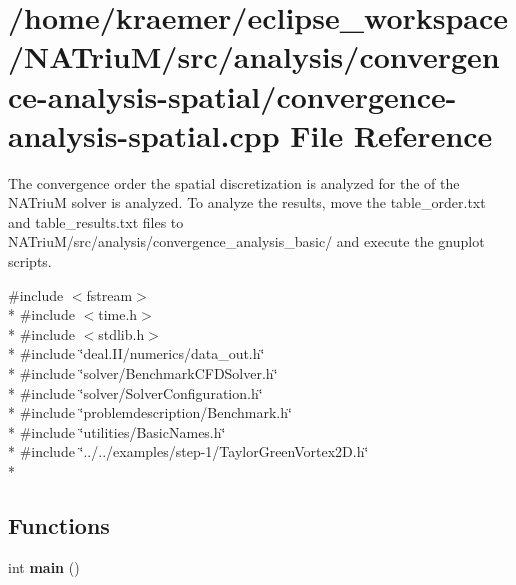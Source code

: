 \hypertarget{convergence-analysis-spatial_8cpp}{\section{/home/kraemer/eclipse\-\_\-workspace/\-N\-A\-Triu\-M/src/analysis/convergence-\/analysis-\/spatial/convergence-\/analysis-\/spatial.cpp File Reference}
\label{convergence-analysis-spatial_8cpp}
}


The convergence order the spatial discretization is analyzed for the of the N\-A\-Triu\-M solver is analyzed. To analyze the results, move the table\-\_\-order.\-txt and table\-\_\-results.\-txt files to N\-A\-Triu\-M/src/analysis/convergence\-\_\-analysis\-\_\-basic/ and execute the gnuplot scripts.  


{\ttfamily \#include $<$fstream$>$}\\*
{\ttfamily \#include $<$time.\-h$>$}\\*
{\ttfamily \#include $<$stdlib.\-h$>$}\\*
{\ttfamily \#include \char`\"{}deal.\-I\-I/numerics/data\-\_\-out.\-h\char`\"{}}\\*
{\ttfamily \#include \char`\"{}solver/\-Benchmark\-C\-F\-D\-Solver.\-h\char`\"{}}\\*
{\ttfamily \#include \char`\"{}solver/\-Solver\-Configuration.\-h\char`\"{}}\\*
{\ttfamily \#include \char`\"{}problemdescription/\-Benchmark.\-h\char`\"{}}\\*
{\ttfamily \#include \char`\"{}utilities/\-Basic\-Names.\-h\char`\"{}}\\*
{\ttfamily \#include \char`\"{}../../examples/step-\/1/\-Taylor\-Green\-Vortex2\-D.\-h\char`\"{}}\\*
\subsection*{Functions}
\begin{DoxyCompactItemize}
\item 
\hypertarget{convergence-analysis-spatial_8cpp_ae66f6b31b5ad750f1fe042a706a4e3d4}{int {\bfseries main} ()}\label{convergence-analysis-spatial_8cpp_ae66f6b31b5ad750f1fe042a706a4e3d4}

\end{DoxyCompactItemize}


